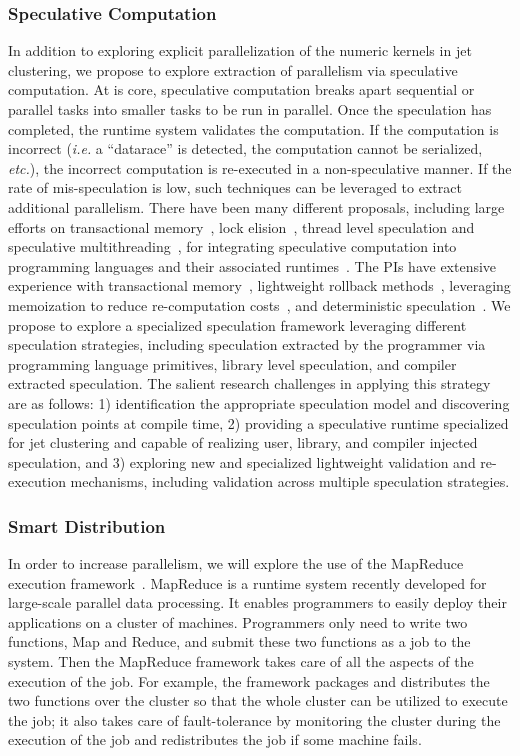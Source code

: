 \documentclass[12pt]{article}
\begin{document}
\subsubsection{Speculative Computation}

In addition to exploring explicit parallelization of the numeric kernels in jet clustering, we
propose to explore extraction of parallelism via speculative computation. At is core, speculative
computation breaks apart sequential or parallel tasks into smaller tasks to be run in parallel. Once
the speculation has completed, the runtime system validates the computation. If the computation is
incorrect ({\em i.e.} a ``datarace'' is detected, the computation cannot be serialized, {\em etc.}), the
incorrect computation is re-executed in a non-speculative manner.  If the rate of mis-speculation
is low, such techniques can be leveraged to extract additional parallelism. There have been many different
proposals, including large efforts on transactional memory~\cite{}, lock elision~\cite{}, thread level speculation and speculative
multithreading~\cite{},
 for integrating speculative computation into programming languages and their associated runtimes~\cite{}.
The PIs have extensive experience with transactional memory~\cite{trans}, lightweight rollback methods~\cite{stab}, 
leveraging memoization to reduce re-computation costs~\cite{memo1, memo2},
and deterministic speculation~\cite{iso}. We propose to explore a specialized speculation framework leveraging different
speculation strategies, including speculation extracted by the programmer via programming language primitives,
library level speculation, and compiler extracted speculation.
The salient research
challenges in applying this strategy are as follows:  1) identification the appropriate speculation model and
discovering speculation points at compile time, 2) providing a speculative runtime specialized for jet clustering
and capable of realizing user, library, and compiler injected speculation, and 3) exploring new and specialized
lightweight validation and re-execution mechanisms, including validation across multiple speculation strategies.




\subsubsection{Smart Distribution}
In order to increase parallelism, we will explore the use of the MapReduce
execution framework~\cite{mapreduce-osdi, mapreduce-hadoop}. MapReduce is a
runtime system recently developed for large-scale parallel data processing. It
enables programmers to easily deploy their applications on a cluster of
machines. Programmers only need to write two functions, Map and Reduce, and
submit these two functions as a job to the system. Then the MapReduce framework
takes care of all the aspects of the execution of the job. For example, the
framework packages and distributes the two functions over the cluster so that
the whole cluster can be utilized to execute the job; it also takes care of
fault-tolerance by monitoring the cluster during the execution of the job and
redistributes the job if some machine fails.
\end{document}
